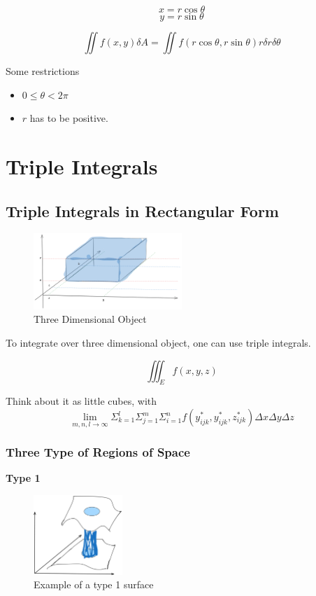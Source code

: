 \documentclass{article}
\begin{document}
$$x = r \cos \theta$$
$$y = r \sin \theta$$

$$\iint f(x, y) \delta A = \iint f(r\cos\theta, r\sin\theta) r \delta r \delta \theta$$

Some restrictions

\begin{itemize}
    \item $0 \leq \theta < 2\pi$
    \item $r$ has to be positive.
\end{itemize}

\section{Triple Integrals}

\subsection{Triple Integrals in Rectangular Form}

\begin{figure}[H]
    \centering
    \includegraphics[width=0.5\textwidth]{figures/Rectangle.png}
    \caption{Three Dimensional Object}
\end{figure}

To integrate over three dimensional object, one can use triple integrals.

$$\iiint_E f(x, y, z)$$

Think about it as little cubes, with $$\lim_{m, n, l \to \infty} \Sigma_{k=1}^l \Sigma_{j = 1}^{m} \Sigma_{i = 1}^n f(y_{ijk}^*, y_{ijk}^*, z_{ijk}^*) \Delta x \Delta y \Delta z$$

\subsubsection{Three Type of Regions of Space}

\textbf{Type 1}

\begin{figure}[H]
    \centering
    \includegraphics[width=0.3\textwidth]{figures/RegionISpace.png}
    \caption{Example of a type 1 surface}
\end{figure}
\end{document}
